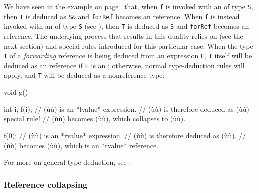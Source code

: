 \noindent We have seen in the example on page~\pageref{f-invoked-example} that,
when \lstinline!f! is invoked with an
 of type \lstinline!S!, then \lstinline!T! is deduced as
\lstinline!S&! and \lstinline!forRef! becomes an  reference.
When \lstinline!f! is instead invoked with an  of type
\lstinline!S! (see ), then \lstinline!T! is deduced as \lstinline!S! and
\lstinline!forRef! becomes an  reference.
The underlying process that results in this duality relies on  (see the next section) and special  rules introduced for this particular case.
When the type \lstinline!T! of a
\emph{forwarding} reference is being deduced from an expression
\lstinline!E!, \lstinline!T! itself will be deduced as an 
reference if \lstinline!E! is an ; otherwise, normal
type-deduction rules will apply, and \lstinline!T! will be deduced as a nonreference type:

\begin{emcppslisting}[emcppsbatch=e3]
void g()
{
    int i;
    f(i);  // (ù{}ù) is an *lvalue* expression.
           // (ù{}ù) is therefore deduced as (ù{}ù) -- special rule!
           // (ù{}ù) becomes (ù{}ù), which collapses to (ù{}ù).

    f(0);  // (ù{}ù) is an *rvalue* expression.
           // (ù{}ù) is therefore deduced as (ù{}ù).
           // (ù{}ù) becomes (ù{}ù), which is an *rvalue* reference.
}
\end{emcppslisting}

\noindent For more on general type deduction, see .

\subsubsection[Reference collapsing]{Reference collapsing}\label{reference-collapsing}

